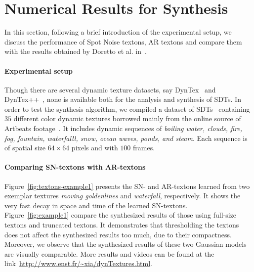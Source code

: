 
\section{Numerical Results for Synthesis}
\label{sec-numerics-1}

In this section, following a brief introduction of the experimental setup, we discuss the performance of Spot Noise textons, AR textons and compare them with  the results obtained by Doretto et al. in~\cite{Doretto04spatiallyhomogeneous}.

\paragraph{Experimental setup}
Though there are several dynamic texture datasets, say DynTex~\cite{dyntex} and DynTex++~\cite{GhanemA07}, none is available both for the analysis and synthesis of SDTs. In order to test the synthesis algorithm, we compiled a dataset of SDTs~\cite{dyntexture_rpn_demo} containing $35$ different color dynamic textures borrowed mainly from the online source of Artbeats footage~\cite{artbeats}. It includes dynamic sequences of {\it boiling water, clouds, fire, fog, fountain, waterfalll, snow, ocean waves, ponds, and steam}. Each sequence is of spatial size $64 \times 64$ pixels and with $100$ frames. 


\paragraph{Comparing SN-textons with AR-textons}
Figure~\ref{fig:textons-example1} presents the SN- and AR-textons learned from two exemplar textures {\it moving goldenlines} and {\it waterfall}, respectively. It shows the very fast decay in space and time of the learned SN-textons. Figure~\ref{fig:example1} compare the synthesized results of those using full-size textons and truncated textons. It demonstrates that thresholding the textons does not affect the synthesized results too much, due to their compactness. Moreover, we observe that the synthesized results of these two Gaussian models are visually comparable. More results and videos can be found at the link~\url{http://www.enst.fr/~xia/dynTextures.html}.

